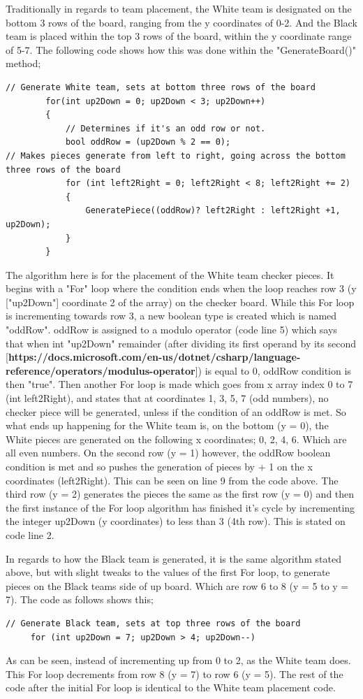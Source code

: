 \documentclass[10pt, a4paper]{article}
\begin{document}
	Traditionally in regards to team placement, the White team is designated on the bottom 3 rows of the board, ranging from the y coordinates of 0-2. And the Black team is placed within the top 3 rows of the board, within the y coordinate range of 5-7. The following code shows how this was done within the "GenerateBoard()" method;
	\begin{lstlisting}[caption = EndTurn()]
// Generate White team, sets at bottom three rows of the board
        for(int up2Down = 0; up2Down < 3; up2Down++)
        {
            // Determines if it's an odd row or not.
            bool oddRow = (up2Down % 2 == 0);
// Makes pieces generate from left to right, going across the bottom three rows of the board
            for (int left2Right = 0; left2Right < 8; left2Right += 2)
            {
                GeneratePiece((oddRow)? left2Right : left2Right +1, up2Down);
            }
        }
	\end{lstlisting}
	The algorithm here is for the placement of the White team checker pieces. It begins with a "For" loop where the condition ends when the loop reaches row 3 (y ["up2Down"] coordinate 2 of the array) on the checker board. While this For loop is incrementing towards row 3, a new boolean type is created which is named "oddRow". oddRow is assigned to a modulo operator (code line 5) which says that when int "up2Down" remainder (after dividing its first operand by its second [\textbf{https://docs.microsoft.com/en-us/dotnet/csharp/language-reference/operators/modulus-operator}]) is equal to 0, oddRow condition is then "true". Then another For loop is made which goes from x array index 0 to 7 (int left2Right), and states that at coordinates 1, 3, 5, 7 (odd numbers), no checker piece will be generated, unless if the condition of an oddRow is met. So what ends up happening for the White team is, on the bottom (y = 0), the White pieces are generated on the following x coordinates; 0, 2, 4, 6. Which are all even numbers. On the second row (y = 1) however, the oddRow boolean condition is met and so pushes the generation of pieces by + 1 on the x coordinates (left2Right). This can be seen on line 9 from the code above. The third row (y = 2) generates the pieces the same as the first row (y = 0) and then the first instance of the For loop algorithm has finished it's cycle by incrementing the integer up2Down (y coordinates) to less than 3 (4th row). This is stated on code line 2.
	 
	 In regards to how the Black team is generated, it is the same algorithm stated above, but with slight tweaks to the values of the first For loop, to generate pieces on the Black teams side of up board. Which are row 6 to 8 (y = 5 to y = 7). The code as follows shows this;
	 \begin{lstlisting}[caption = EndTurn()]
	 // Generate Black team, sets at top three rows of the board
	 for (int up2Down = 7; up2Down > 4; up2Down--)
	 \end{lstlisting}
	 As can be seen, instead of incrementing up from 0 to 2, as the White team does. This For loop decrements from row 8 (y = 7) to row 6 (y = 5). The rest of the code after the initial For loop is identical to the White team placement code.
	 
\end{document}
